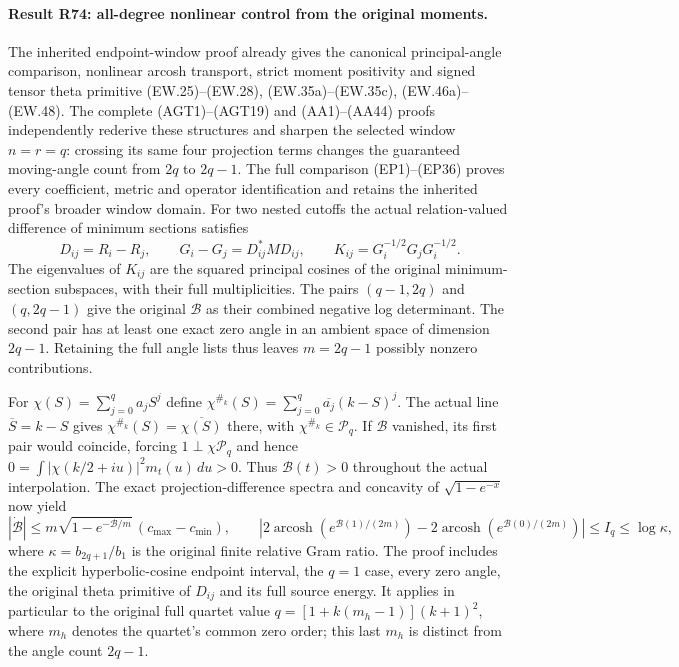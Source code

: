 \paragraph{Result R74: all-degree nonlinear control from the original moments.}
The inherited endpoint-window proof already gives the canonical
principal-angle comparison, nonlinear arcosh transport, strict
moment positivity and signed tensor theta primitive
(EW.25)--(EW.28), (EW.35a)--(EW.35c), (EW.46a)--(EW.48).
The complete (AGT1)--(AGT19) and (AA1)--(AA44) proofs independently
rederive these structures and sharpen the selected window $n=r=q$:
crossing its same four projection terms changes the guaranteed
moving-angle count from $2q$ to $2q-1$. The full comparison
(EP1)--(EP36) proves every coefficient, metric and operator
identification and retains the inherited proof's broader window
domain. For two nested cutoffs the actual relation-valued
difference of minimum sections satisfies
\[
D_{ij}=R_i-R_j,\qquad
G_i-G_j=D_{ij}^*MD_{ij},\qquad
K_{ij}=G_i^{-1/2}G_jG_i^{-1/2}.
\]
The eigenvalues of $K_{ij}$ are the squared principal
cosines of the original minimum-section subspaces, with
their full multiplicities. The pairs $(q-1,2q)$ and
$(q,2q-1)$ give the original $\mathcal B$ as their combined
negative log determinant. The second pair has at least
one exact zero angle in an ambient space of dimension
$2q-1$. Retaining the full angle lists thus leaves
$m=2q-1$ possibly nonzero contributions.

For $\chi(S)=\sum_{j=0}^qa_jS^j$ define
$\chi^{\#_k}(S)=\sum_{j=0}^q\overline{a_j}(k-S)^j$.
The actual line $\overline S=k-S$ gives
$\chi^{\#_k}(S)=\overline{\chi(S)}$ there, with
$\chi^{\#_k}\in\mathcal P_q$. If $\mathcal B$ vanished,
its first pair would coincide, forcing
$1\perp\chi\mathcal P_q$ and hence
$0=\int|\chi(k/2+iu)|^2m_t(u)\,du>0$.
Thus $\mathcal B(t)>0$ throughout the actual interpolation.
The exact projection-difference spectra and concavity of
$\sqrt{1-e^{-x}}$ now yield
\[
|\dot{\mathcal B}|
\le m\sqrt{1-e^{-\mathcal B/m}}\,(c_{\max}-c_{\min}),\qquad
\left|2\operatorname{arcosh}(e^{\mathcal B(1)/(2m)})
-2\operatorname{arcosh}(e^{\mathcal B(0)/(2m)})\right|
\le I_q\le\log\kappa,
\]
where $\kappa=b_{2q+1}/b_1$ is the original finite relative
Gram ratio. The proof includes the explicit hyperbolic-cosine
endpoint interval, the $q=1$ case, every zero angle, the
original theta primitive of $D_{ij}$ and its full source
energy. It applies in particular to the original full
quartet value $q=[1+k(m_h-1)](k+1)^2$, where $m_h$ denotes
the quartet's common zero order; this last $m_h$ is distinct
from the angle count $2q-1$.


